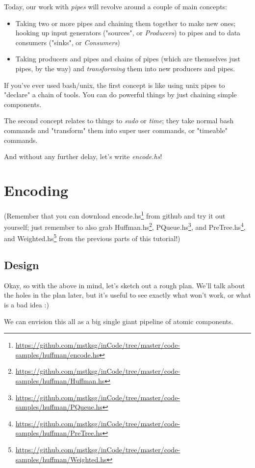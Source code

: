 \documentclass[]{article}
\renewcommand{\href}[2]{#2\footnote{\url{#1}}}
\begin{document}
Today, our work with \emph{pipes} will revolve around a couple of main concepts:

\begin{itemize}
\item
  Taking two or more pipes and chaining them together to make new ones; hooking
  up input generators ("sources", or \emph{Producers}) to pipes and to data
  consumers ("sinks", or \emph{Consumers})
\item
  Taking producers and pipes and chains of pipes (which are themselves just
  pipes, by the way) and \emph{transforming} them into new producers and pipes.
\end{itemize}

If you've ever used bash/unix, the first concept is like using unix pipes to
"declare" a chain of tools. You can do powerful things by just chaining simple
components.

The second concept relates to things to \emph{sudo} or \emph{time}; they take
normal bash commands and "transform" them into super user commands, or
"timeable" commands.

And without any further delay, let's write \emph{encode.hs}!

\section{Encoding}

(Remember that you can download
\href{https://github.com/mstksg/inCode/tree/master/code-samples/huffman/encode.hs}{encode.hs}
from github and try it out yourself; just remember to also grab
\href{https://github.com/mstksg/inCode/tree/master/code-samples/huffman/Huffman.hs}{Huffman.hs},
\href{https://github.com/mstksg/inCode/tree/master/code-samples/huffman/PQueue.hs}{PQueue.hs},
and
\href{https://github.com/mstksg/inCode/tree/master/code-samples/huffman/PreTree.hs}{PreTree.hs},
and
\href{https://github.com/mstksg/inCode/tree/master/code-samples/huffman/Weighted.hs}{Weighted.hs}
from the previous parts of this tutorial!)

\subsection{Design}

Okay, so with the above in mind, let's sketch out a rough plan. We'll talk about
the holes in the plan later, but it's useful to see exactly what won't work, or
what is a bad idea :)

We can envision this all as a big single giant pipeline of atomic components.
\end{document}
